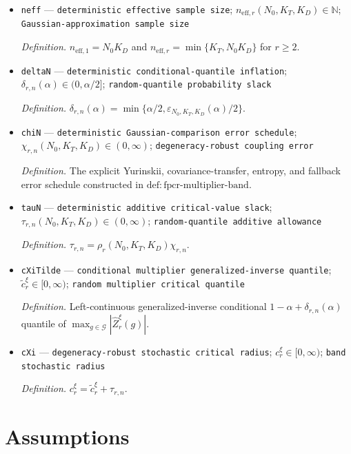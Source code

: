 \documentclass{article}
\begin{document}
\begin{itemize}
  \item \texttt{neff} --- \texttt{deterministic effective sample size}; \(n_{\mathrm{eff},r}(N_0,K_T,K_D)\in\mathbb N\); \texttt{Gaussian-\allowbreak{}approximation sample size}
  \par\smallskip\noindent\emph{Definition.} \(n_{\mathrm{eff},1}=N_0K_D\) and \(n_{\mathrm{eff},r}=\min\{K_T,N_0K_D\}\) for \(r\ge2\).
  \item \texttt{deltaN} --- \texttt{deterministic conditional-\allowbreak{}quantile inflation}; \(\delta_{r,n}(\alpha)\in(0,\alpha/2]\); \texttt{random-\allowbreak{}quantile probability slack}
  \par\smallskip\noindent\emph{Definition.} \(\delta_{r,n}(\alpha)=\min\{\alpha/2,\varepsilon_{N_0,K_T,K_D}(\alpha)/2\}\).
  \item \texttt{chiN} --- \texttt{deterministic Gaussian-\allowbreak{}comparison error schedule}; \(\chi_{r,n}(N_0,K_T,K_D)\in(0,\infty)\); \texttt{degeneracy-\allowbreak{}robust coupling error}
  \par\smallskip\noindent\emph{Definition.} The explicit Yurinskii, covariance-transfer, entropy, and fallback error schedule constructed in \(\mathrm{def:fpcr\mbox{-}multiplier\mbox{-}band}\).
  \item \texttt{tauN} --- \texttt{deterministic additive critical-\allowbreak{}value slack}; \(\tau_{r,n}(N_0,K_T,K_D)\in(0,\infty)\); \texttt{random-\allowbreak{}quantile additive allowance}
  \par\smallskip\noindent\emph{Definition.} \(\tau_{r,n}=\rho_r(N_0,K_T,K_D)\chi_{r,n}\).
  \item \texttt{cXiTilde} --- \texttt{conditional multiplier generalized-\allowbreak{}inverse quantile}; \(\widetilde c_r^\xi\in[0,\infty)\); \texttt{random multiplier critical quantile}
  \par\smallskip\noindent\emph{Definition.} Left-continuous generalized-inverse conditional \(1-\alpha+\delta_{r,n}(\alpha)\) quantile of \(\max_{g\in\mathcal G}|\widehat Z_r^\xi(g)|\).
  \item \texttt{cXi} --- \texttt{degeneracy-\allowbreak{}robust stochastic critical radius}; \(c_r^\xi\in[0,\infty)\); \texttt{band stochastic radius}
  \par\smallskip\noindent\emph{Definition.} \(c_r^\xi=\widetilde c_r^\xi+\tau_{r,n}\).
\end{itemize}

\section{Assumptions}
\end{document}

